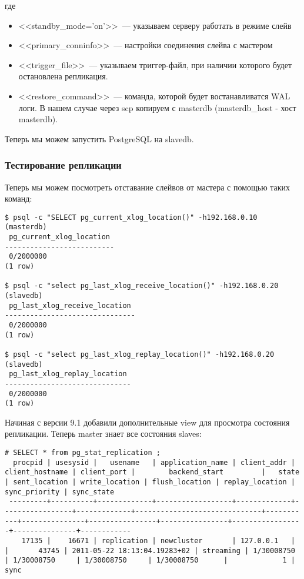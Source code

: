 где
\begin{itemize}
\item <<standby\_mode='on'>>~--- указываем серверу работать в режиме слейв
\item <<primary\_conninfo>>~--- настройки соединения слейва с мастером
\item <<trigger\_file>>~--- указываем триггер-файл, при наличии которого будет остановлена репликация.
\item <<restore\_command>>~--- команда, которой будет востанавливатся WAL логи. В нашем случае через 
scp копируем с masterdb (masterdb\_host - хост masterdb).
\end{itemize}

Теперь мы можем запустить PostgreSQL на slavedb.

\subsubsection{Тестирование репликации}
Теперь мы можем посмотреть отставание слейвов от мастера с помощью таких команд:
\begin{lstlisting}[label=lst:streaming15,caption=Тестирование репликации]
$ psql -c "SELECT pg_current_xlog_location()" -h192.168.0.10 (masterdb)
 pg_current_xlog_location 
--------------------------
 0/2000000
(1 row)

$ psql -c "select pg_last_xlog_receive_location()" -h192.168.0.20 (slavedb)
 pg_last_xlog_receive_location 
-------------------------------
 0/2000000
(1 row)

$ psql -c "select pg_last_xlog_replay_location()" -h192.168.0.20 (slavedb)
 pg_last_xlog_replay_location 
------------------------------
 0/2000000
(1 row)
\end{lstlisting}

Начиная с версии 9.1 добавили дополнительные view для просмотра состояния репликации. Теперь master знает все состояния slaves:

\begin{lstlisting}[label=lst:streaming151,caption=Состояние слейвов]
# SELECT * from pg_stat_replication ;
  procpid | usesysid |   usename   | application_name | client_addr | client_hostname | client_port |        backend_start         |   state   | sent_location | write_location | flush_location | replay_location | sync_priority | sync_state 
 ---------+----------+-------------+------------------+-------------+-----------------+-------------+------------------------------+-----------+---------------+----------------+----------------+-----------------+---------------+------------
    17135 |    16671 | replication | newcluster       | 127.0.0.1   |                 |       43745 | 2011-05-22 18:13:04.19283+02 | streaming | 1/30008750    | 1/30008750     | 1/30008750     | 1/30008750      |             1 | sync
\end{lstlisting}

